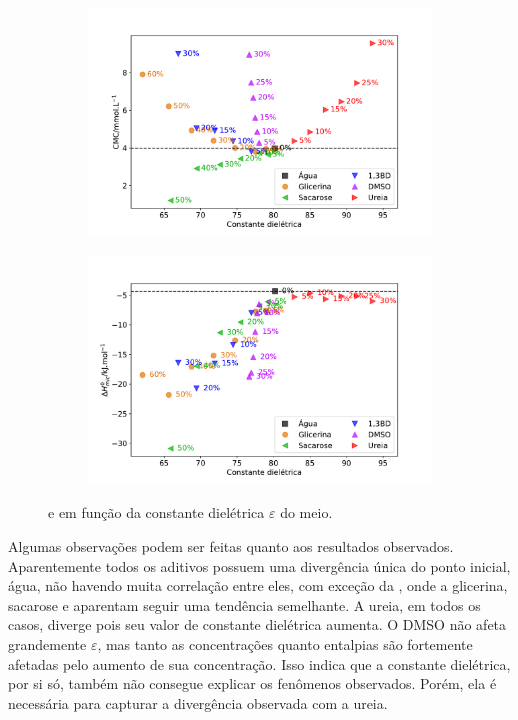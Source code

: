 		\begin{figure}[h]
			\begin{subfigure}[t]{0.5\textwidth}
				\centering
				\includegraphics[width=\textwidth]{imagens/itc/CMC_por_eps}
				\caption{\cmc}
				\label{fig:cmc_por_eps}
			\end{subfigure} %
			\begin{subfigure}[t]{0.5\textwidth}
				\centering
				\includegraphics[width=\textwidth]{imagens/itc/DH_por_eps}
				\caption{\DHmic}
				\label{fig:dh_por_eps}
			\end{subfigure}
			\caption{\cmc{} e \DHmic{} em função da constante dielétrica \(\varepsilon\) do meio.}
			\label{fig:cmc_dh_por_eps}
		\end{figure}
		
		Algumas observações podem ser feitas quanto aos resultados observados. Aparentemente todos os aditivos possuem uma divergência única do ponto inicial, água, não havendo muita correlação entre eles, com exceção da \DHmic{}, onde a glicerina, sacarose e \BD{} aparentam seguir uma tendência semelhante. A ureia, em todos os casos, diverge pois seu valor de constante dielétrica aumenta. O DMSO não afeta grandemente \(\varepsilon\), mas tanto as concentrações quanto entalpias são fortemente afetadas pelo aumento de sua concentração. Isso indica que a constante dielétrica, por si só, também não consegue explicar os fenômenos observados. Porém, ela é necessária para capturar a divergência observada com a ureia.
		
